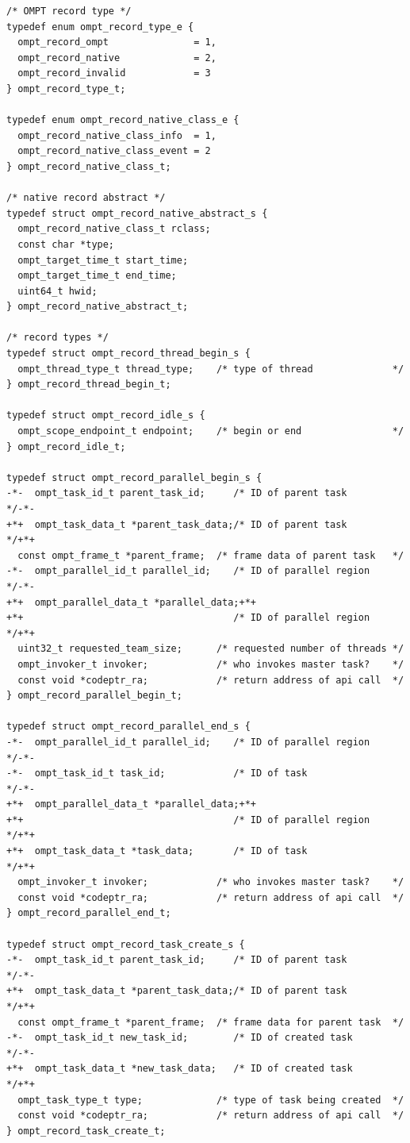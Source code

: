 \documentclass{article}
\begin{document}
\begin{lstlisting}
/* OMPT record type */
typedef enum ompt_record_type_e {
  ompt_record_ompt               = 1,
  ompt_record_native             = 2,
  ompt_record_invalid            = 3
} ompt_record_type_t; 

typedef enum ompt_record_native_class_e {
  ompt_record_native_class_info  = 1,
  ompt_record_native_class_event = 2
} ompt_record_native_class_t;

/* native record abstract */
typedef struct ompt_record_native_abstract_s {
  ompt_record_native_class_t rclass;
  const char *type;
  ompt_target_time_t start_time;
  ompt_target_time_t end_time;
  uint64_t hwid;
} ompt_record_native_abstract_t;

/* record types */
typedef struct ompt_record_thread_begin_s {
  ompt_thread_type_t thread_type;    /* type of thread              */
} ompt_record_thread_begin_t;

typedef struct ompt_record_idle_s {
  ompt_scope_endpoint_t endpoint;    /* begin or end                */
} ompt_record_idle_t;

typedef struct ompt_record_parallel_begin_s {
-*-  ompt_task_id_t parent_task_id;     /* ID of parent task           */-*-
+*+  ompt_task_data_t *parent_task_data;/* ID of parent task           */+*+
  const ompt_frame_t *parent_frame;  /* frame data of parent task   */
-*-  ompt_parallel_id_t parallel_id;    /* ID of parallel region       */-*-
+*+  ompt_parallel_data_t *parallel_data;+*+
+*+                                     /* ID of parallel region       */+*+
  uint32_t requested_team_size;      /* requested number of threads */
  ompt_invoker_t invoker;            /* who invokes master task?    */
  const void *codeptr_ra;            /* return address of api call  */ 
} ompt_record_parallel_begin_t;

typedef struct ompt_record_parallel_end_s {
-*-  ompt_parallel_id_t parallel_id;    /* ID of parallel region       */-*-
-*-  ompt_task_id_t task_id;            /* ID of task                  */-*-
+*+  ompt_parallel_data_t *parallel_data;+*+
+*+                                     /* ID of parallel region       */+*+
+*+  ompt_task_data_t *task_data;       /* ID of task                  */+*+
  ompt_invoker_t invoker;            /* who invokes master task?    */
  const void *codeptr_ra;            /* return address of api call  */ 
} ompt_record_parallel_end_t;

typedef struct ompt_record_task_create_s {
-*-  ompt_task_id_t parent_task_id;     /* ID of parent task           */-*-
+*+  ompt_task_data_t *parent_task_data;/* ID of parent task           */+*+
  const ompt_frame_t *parent_frame;  /* frame data for parent task  */
-*-  ompt_task_id_t new_task_id;        /* ID of created task          */-*-
+*+  ompt_task_data_t *new_task_data;   /* ID of created task          */+*+
  ompt_task_type_t type;             /* type of task being created  */ 
  const void *codeptr_ra;            /* return address of api call  */ 
} ompt_record_task_create_t;


\end{lstlisting}
\end{document}
